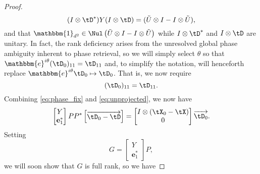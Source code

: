 \begin{proof}
\[(I \otimes \tD^*) Y (I \otimes \tD) = (\tilde{U} \otimes I - I \otimes \tilde{U}),\]
 and that $\mathbbm{1}_{d^2} \in \Nul\left(\tilde{U} \otimes I - I \otimes \tilde{U}\right)$ while $I \otimes \tD^*$ and $I \otimes \tD$ are unitary.  
In fact, the rank deficiency arises from the unresolved global phase ambiguity inherent to phase retrieval, so we will simply select $\theta$ so that 
$ \mathbbm{e}^{i\theta}(\tD_0)_{11} = \tD_{11}$
% 
%
and, to simplify the notation, will henceforth replace $\mathbbm{e}^{i\theta}\tD_0 \mapsto \tD_0$. That is, we now require 
\begin{equation} (\tD_0)_{11} = \tD_{11}\label{eq:phase_fix}.\end{equation} 
%
%
Combining \eqref{eq:phase_fix} and \eqref{eq:unprojected}, we now have \[\begin{bmatrix} Y \\ \mathbf{e}_1^* \end{bmatrix} P P^* \begin{bmatrix} \overrightarrow{\tD_0 - \tD} \end{bmatrix} = \begin{bmatrix} I \otimes (\tX_0 - \tX) \\ 0 \end{bmatrix} \overrightarrow{\tD_0}.\] Setting \[G = \begin{bmatrix} Y \\ \mathbf{e}_1^* \end{bmatrix} P,\] we will soon show that $G$ is full rank, so we have 


\end{proof}
